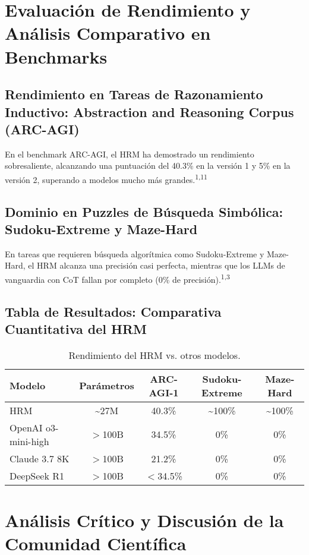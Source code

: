 \documentclass{article}
\begin{document}
	\section{Evaluación de Rendimiento y Análisis Comparativo en Benchmarks}
	
	\subsection{Rendimiento en Tareas de Razonamiento Inductivo: Abstraction and Reasoning Corpus (ARC-AGI)}
	En el benchmark ARC-AGI, el HRM ha demostrado un rendimiento sobresaliente, alcanzando una puntuación del 40.3\% en la versión 1 y 5\% en la versión 2, superando a modelos mucho más grandes.\textsuperscript{1,11}
	
	\subsection{Dominio en Puzzles de Búsqueda Simbólica: Sudoku-Extreme y Maze-Hard}
	En tareas que requieren búsqueda algorítmica como Sudoku-Extreme y Maze-Hard, el HRM alcanza una precisión casi perfecta, mientras que los LLMs de vanguardia con CoT fallan por completo (0\% de precisión).\textsuperscript{1,3}
	
	\subsection{Tabla de Resultados: Comparativa Cuantitativa del HRM}
	\begin{table}[h!]
		\centering
		\caption{Rendimiento del HRM vs. otros modelos.}
		\label{tab:rendimiento}
		\begin{tabular}{@{}lcccc@{}}
			\toprule
			\textbf{Modelo} & \textbf{Parámetros} & \textbf{ARC-AGI-1} & \textbf{Sudoku-Extreme} & \textbf{Maze-Hard} \\
			\midrule
			HRM & \textasciitilde 27M & 40.3\% & \textasciitilde 100\% & \textasciitilde 100\% \\
			OpenAI o3-mini-high & $>$100B & 34.5\% & 0\% & 0\% \\
			Claude 3.7 8K & $>$100B & 21.2\% & 0\% & 0\% \\
			DeepSeek R1 & $>$100B & $<$34.5\% & 0\% & 0\% \\
			\bottomrule
		\end{tabular}
	\end{table}
	
	\section{Análisis Crítico y Discusión de la Comunidad Científica}
	
\end{document}
